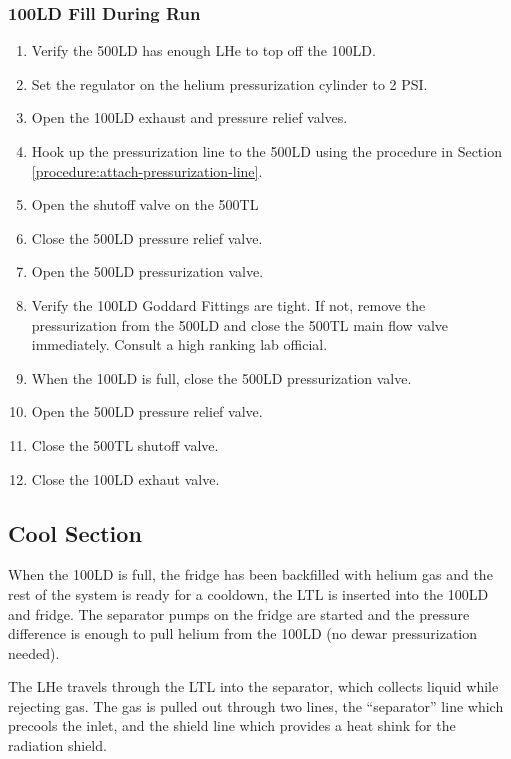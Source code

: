 \subsubsection{100LD Fill During Run}

\begin{enumerate}
 
 \item Verify the 500LD has enough LHe to top off the 100LD.
 \item Set the regulator on the helium pressurization cylinder to 2 PSI.
 \item Open the 100LD exhaust and pressure relief valves.
 \item Hook up the pressurization line to the 500LD using the procedure in Section \ref{procedure:attach-pressurization-line}.
 \item Open the shutoff valve on the 500TL
 \item Close the 500LD pressure relief valve.
 \item Open the 500LD pressurization valve.
 \item Verify the 100LD Goddard Fittings are tight.  If not, remove the pressurization from the 500LD and close the 500TL main flow valve immediately.  Consult a high ranking lab official.
 \item When the 100LD is full, close the 500LD pressurization valve.
 \item Open the 500LD pressure relief valve.
 \item Close the 500TL shutoff valve.
 \item Close the 100LD exhaut valve.
 
\end{enumerate}


\subsection{Cool \hef{} Section}

When the 100LD is full, the fridge has been backfilled with helium gas and the rest of the system is ready for a cooldown, the LTL is inserted into the 100LD and fridge.  The separator pumps on the fridge are started and the pressure difference is enough to pull helium from the 100LD (no dewar pressurization needed).

The LHe travels through the LTL into the separator, which collects liquid while rejecting gas.  The gas is pulled out through two lines, the ``separator'' line which precools the \het{} inlet, and the shield line which provides a heat shink for the radiation shield.

